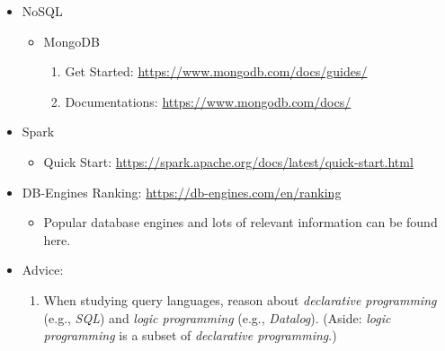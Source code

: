 \documentclass{article}
\begin{document}
\begin{enumerate}
\begin{itemize}
        \item NoSQL
        \begin{itemize}
            \item MongoDB
            \begin{enumerate}
                \item Get Started:
                \href{https://www.mongodb.com/docs/guides/}{https://www.mongodb.com/docs/guides/}
                \item Documentations:
                \href{https://www.mongodb.com/docs/}{https://www.mongodb.com/docs/}
            \end{enumerate}
        \end{itemize}
        \item Spark
        \begin{itemize}
            \item Quick Start:
            \href{https://spark.apache.org/docs/latest/quick-start.html}{https://spark.apache.org/docs/latest/quick-start.html}
        \end{itemize}
        \item DB-Engines Ranking:
            \href{https://db-engines.com/en/ranking}{https://db-engines.com/en/ranking}
            \begin{itemize}
                \item Popular database engines and lots of relevant information can be found here.
            \end{itemize}        
        \item Advice:
        \begin{enumerate}
            \item When studying query languages, reason about \emph{declarative programming} (e.g., \emph{SQL}) and \emph{logic programming} (e.g., \emph{Datalog}).
            (Aside: \emph{logic programming} is a subset of \emph{declarative programming}.)
        \end{enumerate}
    \end{itemize}


\end{enumerate}
\end{document}
